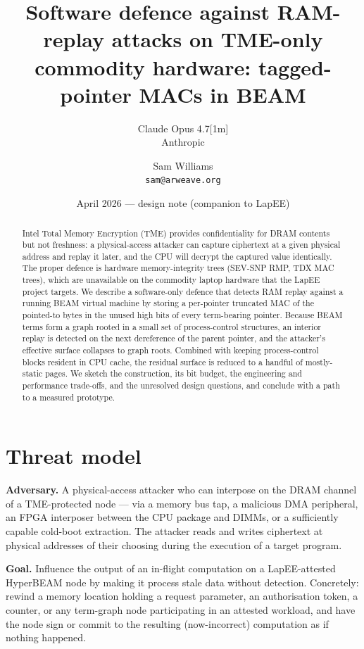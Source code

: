 \documentclass[10pt,a4paper]{article}
\title{\vspace{-3em}\textbf{Software defence against RAM-replay attacks on
        TME-only commodity hardware: tagged-pointer MACs in BEAM}}
\author{%
  Claude Opus 4.7[1m]\\\small{Anthropic}
  \and
  Sam Williams\\\small{\texttt{sam@arweave.org}}
}
\date{April 2026 --- design note (companion to LapEE)}
\begin{document}
\maketitle
\vspace{-1.8em}

\begin{abstract}
\noindent
Intel Total Memory Encryption (TME) provides confidentiality for DRAM contents
but not freshness: a physical-access attacker can capture ciphertext at a
given physical address and replay it later, and the CPU will decrypt the
captured value identically. The proper defence is hardware memory-integrity
trees (SEV-SNP RMP, TDX MAC trees), which are unavailable on the commodity
laptop hardware that the LapEE project targets. We describe a
software-only defence that detects RAM replay against a running BEAM virtual
machine by storing a per-pointer truncated MAC of the pointed-to bytes in
the unused high bits of every term-bearing pointer. Because BEAM terms form
a graph rooted in a small set of process-control structures, an interior
replay is detected on the next dereference of the parent pointer, and the
attacker's effective surface collapses to graph roots. Combined with
keeping process-control blocks resident in CPU cache, the residual surface
is reduced to a handful of mostly-static pages. We sketch the construction,
its bit budget, the engineering and performance trade-offs, and the
unresolved design questions, and conclude with a path to a measured
prototype.
\end{abstract}

\section{Threat model}

\textbf{Adversary.} A physical-access attacker who can interpose on the
DRAM channel of a TME-protected node --- via a memory bus tap, a malicious
DMA peripheral, an FPGA interposer between the CPU package and DIMMs, or
a sufficiently capable cold-boot extraction. The attacker reads and
writes ciphertext at physical addresses of their choosing during the
execution of a target program.

\textbf{Goal.} Influence the output of an in-flight computation on a
LapEE-attested HyperBEAM node by making it process stale data without
detection. Concretely: rewind a memory location holding a request
parameter, an authorisation token, a counter, or any term-graph node
participating in an attested workload, and have the node sign or commit
to the resulting (now-incorrect) computation as if nothing happened.
\end{document}
